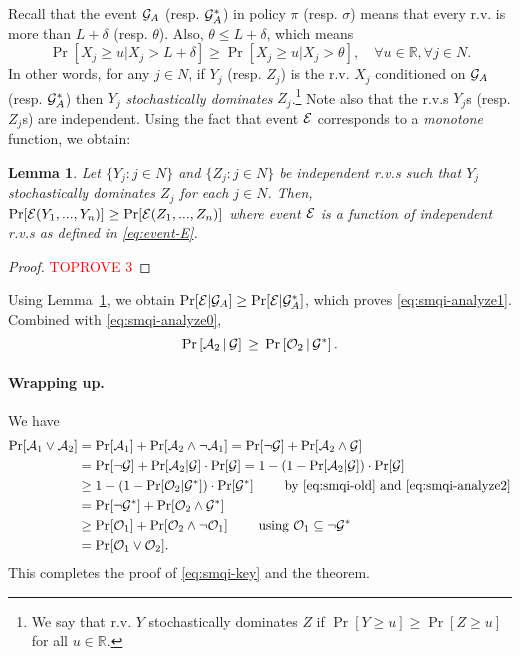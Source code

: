 \documentclass[11pt]{article}
\newtheorem{lem}[thm]{Lemma}
\theoremstyle{remark}
\theoremstyle{plain}
\theoremstyle{remark}
\begin{document}
Recall that the event ${\cal G}_A$ (resp. ${\cal G}^*_A$) in policy $\pi$ (resp. $\sigma$) means that every  r.v. is more than $L+\delta$ (resp. $\theta$). Also, $\theta \le L+\delta$, which means 
$$\Pr[X_j \ge u| X_j >L+\delta] \ge \Pr[X_j\ge u | X_j >\theta], \quad \forall u\in \mathbb{R} , \forall j\in N. $$
In other words, for any $j\in N$, if  $Y_j$ (resp. $Z_j$) is the  r.v. $X_j$ conditioned on ${\cal G}_A$ (resp. ${\cal G}^*_A$)
then $Y_j$ {\em stochastically dominates} $Z_j$.\footnote{We say that r.v. $Y$ stochastically dominates $Z$ if $\Pr[Y\ge u]\ge \Pr[Z\ge u]$ for all $u\in \mathbb{R}$.} Note also that the r.v.s $Y_j$s (resp. $Z_j$s) are independent. Using the fact that event ${\cal E}$ corresponds to a {\em monotone} function, we obtain:
\begin{lem} \label{lem:event-sd}
Let $\{Y_j:j\in N\}$ and  $\{Z_j:j\in N\}$ be independent r.v.s such that $Y_j$  stochastically dominates $Z_j$ for each $j\in N$. Then, $\Pr[ {\cal E}(Y_1,...,Y_n ) ] \ge  \Pr[{\cal E}(Z_1,...,Z_n)]$ where event ${\cal E}$ is a function of independent r.v.s as defined in \eqref{eq:event-E}.  
\end{lem}
\begin{proof}\textcolor{red}{TOPROVE 3}\end{proof}
 
Using Lemma~\ref{lem:event-sd}, we obtain   $\Pr[{\cal E}  | {\cal G}_A] \ge \Pr[{\cal E} | {\cal G}^*_A]$, which proves \eqref{eq:smqi-analyze1}. Combined with \eqref{eq:smqi-analyze0},  
 \begin{equation}\label{eq:smqi-analyze2}
 \Pr\left[{\cal A}_2\, |\, {\cal G} \right] \,\ge\,  \Pr\left[{\cal O}_2\, | \, {\cal G}^* \right].
\end{equation} 

\paragraph{Wrapping up.} We have
\begin{align*}
    \Pr[{\cal A}_1 \vee {\cal A}_2] &=     \Pr[{\cal A}_1] +     \Pr[{\cal A}_2 \wedge \neg {\cal A}_1] = \Pr[\neg {\cal G}] + \Pr[{\cal A}_2 \wedge  {\cal G}]\\
    & = \Pr[\neg {\cal G}] + \Pr[{\cal A}_2 |{\cal G}]\cdot \Pr[{\cal G}] = 1 - \left( 1 -  \Pr[{\cal A}_2 |{\cal G}]\right) \cdot \Pr[{\cal G}]\\
    & \ge 1 - \left( 1 -  \Pr[{\cal O}_2 |{\cal G}^*]\right) \cdot \Pr[{\cal G}^*]\qquad \text{ by \eqref{eq:smqi-old} and \eqref{eq:smqi-analyze2}}\\
    &= \Pr[\neg {\cal G}^*] + \Pr[{\cal O}_2 \wedge  {\cal G}^*]\\
    & \ge \Pr[{\cal O}_1] +     \Pr[{\cal O}_2 \wedge \neg {\cal O}_1] \qquad \text{ using  }{\cal O}_1\subseteq \neg {\cal G}^* \\
    & =    \Pr[{\cal O}_1 \vee {\cal O}_2].
\end{align*}
This completes the proof of \eqref{eq:smqi-key} and the theorem.
\end{document}
